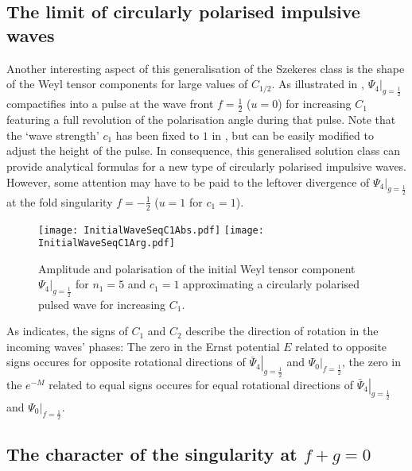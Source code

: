 \documentclass[12pt]{iopart}
\begin{document}
\subsection{The limit of circularly polarised impulsive waves}

Another interesting aspect of this generalisation of the Szekeres class is the shape of the Weyl tensor components for large values of $C_{1/2}$. As illustrated in , $\left.\Psi_4\right\vert_{g=\frac12}$ compactifies into a pulse at the wave front $f=\frac12$ ($u=0$) for increasing $C_1$ featuring a full revolution of the polarisation angle during that pulse. Note that the `wave strength' $c_1$ has been fixed to $1$ in , but can be easily modified to adjust the height of the pulse. In consequence, this generalised solution class can provide analytical formulas for a new type of circularly polarised impulsive waves. However, some attention may have to be paid to the leftover divergence of $\left.\Psi_4\right\vert_{g=\frac12}$ at the fold singularity $f=-\frac12$ ($u=1$ for $c_1=1$).
%
\begin{figure}[ht]
\centering
\texttt{[image: InitialWaveSeqC1Abs.pdf]}
\texttt{[image: InitialWaveSeqC1Arg.pdf]}
\caption{Amplitude and polarisation of the initial Weyl tensor component $\left.\Psi_4\right\vert_{g=\frac12}$ for $n_1=5$ and $c_1=1$ approximating a circularly polarised pulsed wave for increasing $C_1$.}
\label{fig:Initial_profile}
\end{figure} 

As  indicates, the signs of $C_1$ and $C_2$ describe the direction of rotation in the incoming waves' phases: The zero in the Ernst potential $E$ related to opposite signs occures for opposite rotational directions of $\left.\bar{\Psi}_4\right\vert_{g=\frac12}$ and $\left.\Psi_0\right\vert_{f=\frac12}$, the zero in the $e^{-M}$ related to equal signs occures for equal rotational directions of $\left.\bar{\Psi}_4\right\vert_{g=\frac12}$ and $\left.\Psi_0\right\vert_{f=\frac12}$. 

\subsection{The character of the singularity at $f+g=0$}
\end{document}
